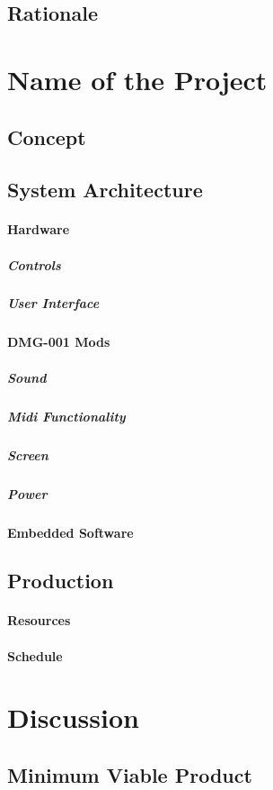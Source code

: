 \documentclass[]{article}
\begin{document}
        \nocite{MARQUEZ2014}


    \subsection{Rationale} %


\section{Name of the Project} %
    \subsection{Concept}
    \subsection{System Architecture}
        \paragraph{Hardware}
            \subparagraph{Controls}
            \subparagraph{User Interface}
        \paragraph{DMG-001 Mods}
            \subparagraph{Sound}
            \subparagraph{Midi Functionality}
            \subparagraph{Screen}
            \subparagraph{Power}
        \paragraph{Embedded Software}
    \subsection{Production}
        \paragraph{Resources}
        \paragraph{Schedule}

\section{Discussion}
    \subsection{Minimum Viable Product}
\end{document}
